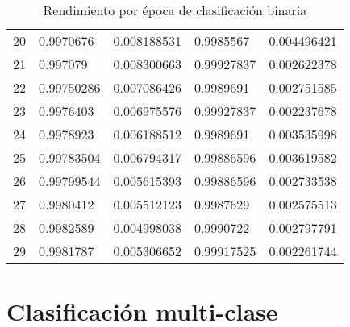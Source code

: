\begin{table}[H]
{\begin{tabular}{@{}lllll@{}}
    20 & 0.9970676 & 0.008188531 & 0.9985567 & 0.004496421 \\
    21 & 0.997079 & 0.008300663 & 0.99927837 & 0.002622378 \\
    22 & 0.99750286 & 0.007086426 & 0.9989691 & 0.002751585 \\
    23 & 0.9976403 & 0.006975576 & 0.99927837 & 0.002237678 \\
    24 & 0.9978923 & 0.006188512 & 0.9989691 & 0.003535998 \\
    25 & 0.99783504 & 0.006794317 & 0.99886596 & 0.003619582 \\
    26 & 0.99799544 & 0.005615393 & 0.99886596 & 0.002733538 \\
    27 & 0.9980412 & 0.005512123 & 0.9987629 & 0.002575513 \\
    28 & 0.9982589 & 0.004998038 & 0.9990722 & 0.002797791 \\
    29 & 0.9981787 & 0.005306652 & 0.99917525 & 0.002261744 \\ \bottomrule
    \end{tabular}%
    }
    \caption{Rendimiento por época de clasificación binaria}\label{tabla:rendimiento:final}
    \end{table}

    \section{Clasificación multi-clase}


